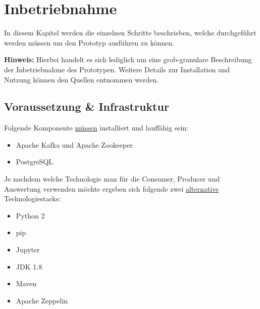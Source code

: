 \chapter{Inbetriebnahme}
\label{chap:betrieb}
In diesem Kapitel werden die einzelnen Schritte beschrieben, welche durchgeführt werden müssen um den Prototyp ausführen zu können.

\textbf{Hinweis:}
\newline
Hierbei handelt es sich lediglich um eine grob-granulare Beschreibung der Inbetriebnahme des Prototypen.
Weitere Details zur Installation und Nutzung können den Quellen entnommen werden.

\section{Voraussetzung \& Infrastruktur}
Folgende Komponente \underline{müssen}  installiert und lauffähig sein:
\begin{itemize}
  \item Apache Kafka und Apache Zookeeper
  \item PostgreSQL
\end{itemize}


Je nachdem welche Technologie man für die Consumer, Producer und Auswertung verwenden möchte ergeben sich folgende zwei \underline{alternative} Technologiestacks:
\setlength{\columnseprule}{1pt}
\def\columnseprulecolor{\color{black}}
\begin{multicols}{2}
	\begin{itemize}
		\item Python 2
		\item pip
		\item Jupyter
	\end{itemize}
\columnbreak
	\begin{itemize}
		\item JDK 1.8
		\item Maven
		\item Apache Zeppelin
	\end{itemize}
\end{multicols}
\newpage

